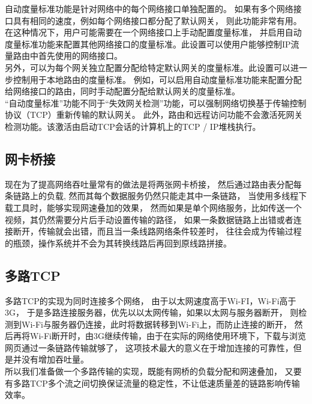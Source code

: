 \documentclass[11pt]{article}
\begin{document}
自动度量标准功能是针对网络中的每个网络接口单独配置的。
如果有多个网络接口具有相同的速度，例如每个网络接口都分配了默认网关，
则此功能非常有用。在这种情况下，用户可能需要在一个网络接口上手动配置度量标准，
并启用自动度量标准功能来配置其他网络接口的度量标准。此设置可以使用户能够控制IP流量路由中首先使用的网络接口。
\\
另外，可以为每个网关独立配置分配给特定默认网关的度量标准。此设置可以进一步控制用于本地路由的度量标准。
例如，可以启用自动度量标准功能来配置分配给网络接口的路由，同时手动配置分配给默认网关的度量标准。
\\
“自动度量标准”功能不同于“失效网关检测”功能，可以强制网络切换基于传输控制协议（TCP）重新传输的默认网关。
此外，路由和远程访问功能不会激活死网关检测功能。该激活由启动TCP会话的计算机上的TCP / IP堆栈执行。
\subsection{网卡桥接}
现在为了提高网络吞吐量常有的做法是将两张网卡桥接，
然后通过路由表分配每条链路上的负载,
然而其每个数据服务仍然只能走其中一条链路，
当使用多线程下载工具时，能够实现网速叠加的效果，
然而如果是单个网络服务，比如传送一个视频，其仍然需要分片后手动设置传输的路径，
如果一条数据链路上出错或者连接断开，传输就会出错，而且当一条线路网络条件较差时，
往往会成为传输过程的瓶颈，操作系统并不会为其转换线路后再回到原线路拼接。
\subsection{多路TCP}
多路TCP的实现为同时连接多个网络，
由于以太网速度高于Wi-FI，Wi-Fi高于3G，
于是多路连接服务器，优先以以太网传输，如果以太网与服务器断开，
则检测到Wi-Fi与服务器仍连接，此时将数据转移到Wi-Fi上，而防止连接的断开，
然后再将Wi-Fi断开时，由3G继续传输，由于在实际的网络使用环境下，下载与浏览网页通过一条链路传输就够了，
这项技术最大的意义在于增加连接的可靠性，但是并没有增加吞吐量。
\\
所以我们准备做一个多路传输的实现，既能有网桥的负载分配和网速叠加，
又要有多路TCP多个流之间切换保证流量的稳定性，不让低速质量差的链路影响传输效率。
\end{document}
